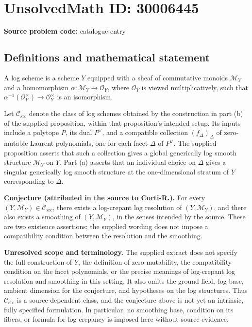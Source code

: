 \documentclass[11pt]{article}
\begin{document}
\section*{UnsolvedMath ID: 30006445}
\textbf{Source problem code:} catalogue entry
\subsection{Definitions and mathematical statement}
A log scheme is a scheme \(Y\) equipped with a sheaf of commutative monoids \(\mathcal M_Y\) and a homomorphism \(\alpha:\mathcal M_Y\to\mathcal O_Y\), where \(\mathcal O_Y\) is viewed multiplicatively, such that \(\alpha^{-1}(\mathcal O_Y^\times)\to\mathcal O_Y^\times\) is an isomorphism.

Let \(\mathcal C_{\mathrm{src}}\) denote the class of log schemes obtained by the construction in part (b) of the supplied proposition, within that proposition's intended setup. Its inputs include a polytope \(P\), its dual \(P^\vee\), and a compatible collection \((f_\Delta)_{\Delta}\) of zero-mutable Laurent polynomials, one for each facet \(\Delta\) of \(P^\vee\). The supplied proposition asserts that such a collection gives a global generically log smooth structure \(\mathcal M_Y\) on \(Y\). Part (a) asserts that an individual choice on \(\Delta\) gives a singular generically log smooth structure at the one-dimensional stratum of \(Y\) corresponding to \(\Delta\).

\textbf{Conjecture (attributed in the source to Corti-R.).} For every \((Y,\mathcal M_Y)\in\mathcal C_{\mathrm{src}}\), there exists a log-crepant log resolution of \((Y,\mathcal M_Y)\), and there also exists a smoothing of \((Y,\mathcal M_Y)\), in the senses intended by the source. These are two existence assertions; the supplied wording does not impose a compatibility condition between the resolution and the smoothing.

\textbf{Unresolved scope and terminology.} The supplied extract does not specify the full construction of \(Y\), the definition of zero-mutability, the compatibility condition on the facet polynomials, or the precise meanings of log-crepant log resolution and smoothing in this setting. It also omits the ground field, log base, ambient dimension for the conjecture, and hypotheses on the log structures. Thus \(\mathcal C_{\mathrm{src}}\) is a source-dependent class, and the conjecture above is not yet an intrinsic, fully specified formulation. In particular, no smoothing base, condition on its fibers, or formula for log crepancy is imposed here without source evidence.
\end{document}
